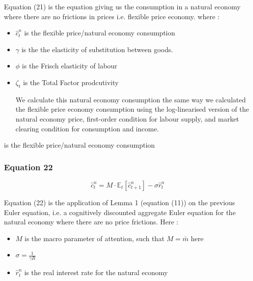\documentclass{article}
\begin{document}
Equation (21) is the equation giving us the consumption in a natural economy where there are no frictions in prices i.e. flexible price economy. where :
\begin{itemize}
    \item $\hat{c}_{t}^{n}$ is the flexible price/natural economy consumption 
    \item $\gamma$ is the the elasticity of substitution between goods. 
    \item $\phi$ is the Frisch elasticity of labour
    \item $\zeta_{t}$ is the Total Factor prodcutivity

We calculate this natural economy consumption the same way we calculated the flexible price economy consumption using the log-linearised version of the natural economy price, first-order condition for labour supply, and market clearing condition for consumption and income. 
\end{itemize} is the flexible price/natural economy consumption

\subsubsection*{Equation 22}
\begin{equation}\tag{22}
    \hat{c}^{n}_{t} = M\cdot\mathbb{E}_{t}\left[\hat{c}^{n}_{t+1}\right]-\sigma\hat{r}^{n}_{t}
\end{equation}

Equation (22) is the application of Lemma 1 (equation (11)) on the previous Euler equation, i.e. a cognitively discounted aggregate Euler equation for the natural economy where there are no price frictions. Here : 
\begin{itemize}
    \item $M$ is the macro parameter of attention, such that $M=\bar{m}$ here
    \item $\sigma=\frac{1}{\gamma R}$ 
    \item $\hat r_{t}^{n}$ is the real interest rate for the natural economy
\end{itemize}
\end{document}
